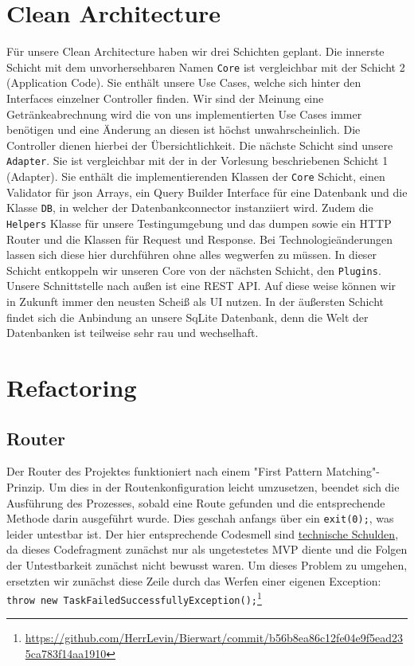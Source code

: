 \documentclass[12pt,a4paper,titlepage,ngerman,pdftex]{report}
\begin{document}
    \section{Clean Architecture}\label{sec:cleanarchitecture}
    Für unsere Clean Architecture haben wir drei Schichten geplant.
    Die innerste Schicht mit dem unvorhersehbaren Namen \verb|Core| ist vergleichbar mit der Schicht 2 (Application Code).
    Sie enthält unsere Use Cases, welche sich hinter den Interfaces einzelner Controller finden.
    Wir sind der Meinung eine Getränkeabrechnung wird die von uns implementierten Use Cases immer benötigen und eine Änderung an diesen ist höchst unwahrscheinlich.
    Die Controller dienen hierbei der Übersichtlichkeit.
    Die nächste Schicht sind unsere \verb|Adapter|.
    Sie ist vergleichbar mit der in der Vorlesung beschriebenen Schicht 1 (Adapter).
    Sie enthält die implementierenden Klassen der \verb|Core| Schicht, einen Validator für json Arrays, ein Query Builder Interface für eine Datenbank und die Klasse \verb|DB|, in welcher der Datenbankconnector instanziiert wird.
    Zudem die \verb|Helpers| Klasse für unsere Testingumgebung und das dumpen sowie ein HTTP Router und die Klassen für Request und Response.
    Bei Technologieänderungen lassen sich diese hier durchführen ohne alles wegwerfen zu müssen.
    In dieser Schicht entkoppeln wir unseren Core von der nächsten Schicht, den \verb|Plugins|.
    Unsere Schnittstelle nach außen ist eine REST API.
    Auf diese weise können wir in Zukunft immer den neusten Scheiß als UI nutzen.
    In der äußersten Schicht findet sich die Anbindung an unsere SqLite Datenbank, denn die Welt der Datenbanken ist teilweise sehr rau und wechselhaft.

    \section{Refactoring}\label{sec:refactoring}

    \subsection{Router}\label{subsec:router}
    Der Router des Projektes funktioniert nach einem "First Pattern Matching"-Prinzip.
    Um dies in der Routenkonfiguration leicht umzusetzen, beendet sich die Ausführung des Prozesses, sobald eine Route gefunden und die entsprechende Methode darin ausgeführt wurde.
    Dies geschah anfangs über ein \verb|exit(0);|, was leider untestbar ist.
    Der hier entsprechende Codesmell sind \href{https://refactoring.guru/refactoring/technical-debt}{technische Schulden}, da dieses Codefragment zunächst nur als ungetestetes MVP diente und die Folgen der \glqq Untestbarkeit\grqq{} zunächst nicht bewusst waren.
    Um dieses Problem zu umgehen, ersetzten wir zunächst diese Zeile durch das Werfen einer eigenen Exception: \verb|throw new TaskFailedSuccessfullyException();|\footnote{\url{https://github.com/HerrLevin/Bierwart/commit/b56b8ea86c12fe04e9f5ead235ca783f14aa1910}}
\end{document}
